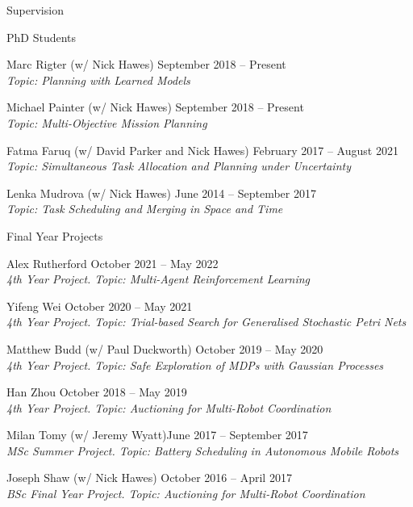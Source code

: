 \begin{rSection}{Supervision}
\begin{rSubsection}{PhD Students}{}{}{}
\item  Marc Rigter (w/ Nick Hawes) \hfill September 2018 -- Present\\
\textit{Topic: Planning with Learned Models}

\item  Michael Painter  (w/ Nick Hawes) \hfill September 2018 -- Present\\
\textit{Topic: Multi-Objective Mission Planning}

\item  Fatma Faruq  (w/ David Parker and Nick Hawes) \hfill February 2017 -- August 2021\\
\textit{Topic: Simultaneous Task Allocation and Planning under Uncertainty}

\item  Lenka Mudrova (w/ Nick Hawes) \hfill June 2014 -- September 2017\\
\textit{Topic: Task Scheduling and Merging in Space and Time}

\end{rSubsection}

\begin{rSubsection}{Final Year Projects}{}{}{}

\item Alex Rutherford  \hfill October 2021 -- May 2022\\
\textit{4th Year Project. Topic: Multi-Agent Reinforcement Learning}

\item Yifeng Wei  \hfill October 2020 -- May 2021\\
\textit{4th Year Project. Topic: Trial-based Search for Generalised Stochastic Petri Nets}

\item Matthew Budd  (w/ Paul Duckworth)  \hfill October 2019 -- May 2020\\
\textit{4th Year Project. Topic: Safe Exploration of MDPs with Gaussian Processes}

\item Han Zhou \hfill October 2018 -- May 2019\\
\textit{4th Year Project. Topic: Auctioning for Multi-Robot Coordination}

\item   Milan Tomy (w/ Jeremy Wyatt)\hfill June 2017 -- September 2017\\
\textit{MSc Summer Project. Topic: Battery Scheduling in Autonomous Mobile Robots}

\item   Joseph Shaw (w/ Nick Hawes) \hfill October 2016 -- April 2017\\
\textit{BSc Final Year Project. Topic: Auctioning for Multi-Robot Coordination}


\end{rSubsection}
\end{rSection}
